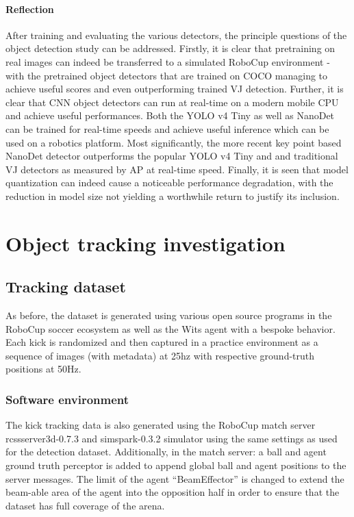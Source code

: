 \documentclass[a4paper,twoside,12pt]{report}
\begin{document}
\subsubsection{Reflection}

After training and evaluating the various detectors, the principle questions of the object detection study can be addressed. Firstly, it is clear that pretraining on real images can indeed be transferred to a simulated RoboCup environment - with the pretrained object detectors that are trained on COCO managing to achieve useful scores and even outperforming trained VJ detection. Further, it is clear that CNN object detectors can run at real-time on a modern mobile CPU and achieve useful performances. Both the YOLO v4 Tiny as well as NanoDet can be trained for real-time speeds and achieve useful inference which can be used on a robotics platform. Most significantly, the more recent key point based NanoDet detector outperforms the popular YOLO v4 Tiny and and traditional VJ detectors as measured by AP at real-time speed. Finally, it is seen that model quantization can indeed cause a noticeable performance degradation, with the reduction in model size not yielding a worthwhile return to justify its inclusion. 

\chapter{Object tracking investigation}

\section{Tracking dataset}
As before, the dataset is generated using various open source programs in the RoboCup soccer ecosystem as well as the Wits agent with a bespoke behavior. Each kick is randomized and then captured in a practice environment as a sequence of images (with metadata) at 25hz with respective ground-truth positions at 50Hz.

\subsection{Software environment}
The kick tracking data is also generated using the RoboCup match server rcssserver3d-0.7.3 and simspark-0.3.2 simulator using the same settings as used for the detection dataset. Additionally, in the match server: a ball and agent ground truth perceptor is added to append global ball and agent positions to the server messages. The limit of the agent ``BeamEffector'' is changed to extend the beam-able area of the agent into the opposition half in order to ensure that the dataset has full coverage of the arena.
\end{document}
